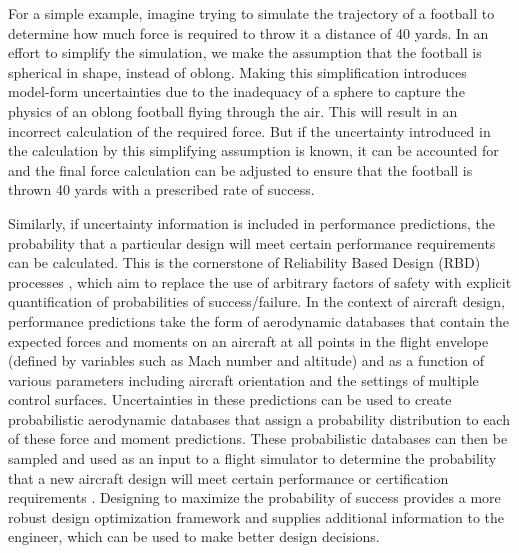 For a simple example, imagine trying to simulate the trajectory of a football to determine how much force is required to throw it a distance of 40 yards. In an effort to simplify the simulation, we make the assumption that the football is spherical in shape, instead of oblong. Making this simplification introduces model-form uncertainties due to the inadequacy of a sphere to capture the physics of an oblong football flying through the air. This will result in an incorrect calculation of the required force. But if the uncertainty introduced in the calculation by this simplifying assumption is known, it can be accounted for and the final force calculation can be adjusted to ensure that the football is thrown 40 yards with a prescribed rate of success. 

Similarly, if uncertainty information is included in performance predictions, the probability that a particular design will meet certain performance requirements can be calculated. This is the cornerstone of Reliability Based Design (RBD) processes \cite{reliability}, which aim to replace the use of arbitrary factors of safety with explicit quantification of probabilities of success/failure. In the context of aircraft design, performance predictions take the form of aerodynamic databases that contain the expected forces and moments on an aircraft at all points in the flight envelope (defined by variables such as Mach number and altitude) and as a function of various parameters including aircraft orientation and the settings of multiple control surfaces. Uncertainties in these predictions can be used to create probabilistic aerodynamic databases that assign a probability distribution to each of these force and moment predictions. These probabilistic databases can then be sampled and used as an input to a flight simulator to determine the probability that a new aircraft design will meet certain performance or certification requirements \cite{wendorff_combining_2016}. Designing to maximize the probability of success provides a more robust design optimization framework \cite{ng_multifidelity_2014,multif} and supplies additional information to the engineer, which can be used to make better design decisions.

